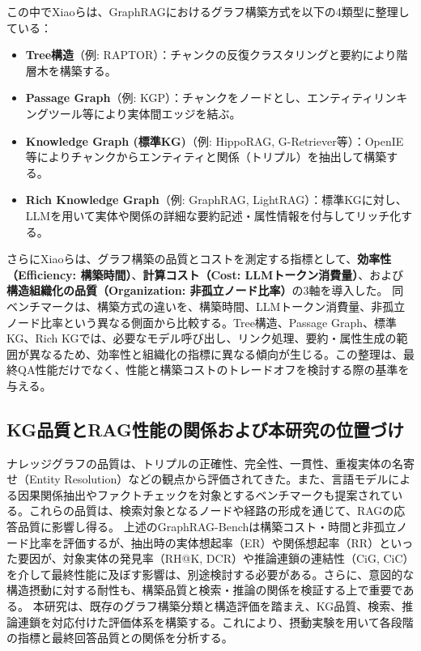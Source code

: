 \documentclass[a4j,dvipdfmx]{jsarticle}
\begin{document}
この中でXiaoらは、GraphRAGにおけるグラフ構築方式を以下の4類型に整理している：
\begin{itemize}
    \item \textbf{Tree構造}（例: RAPTOR）：チャンクの反復クラスタリングと要約により階層木を構築する。
    \item \textbf{Passage Graph}（例: KGP）：チャンクをノードとし、エンティティリンキングツール等により実体間エッジを結ぶ。
    \item \textbf{Knowledge Graph (標準KG)}（例: HippoRAG, G-Retriever等）：OpenIE等によりチャンクからエンティティと関係（トリプル）を抽出して構築する。
    \item \textbf{Rich Knowledge Graph}（例: GraphRAG, LightRAG）：標準KGに対し、LLMを用いて実体や関係の詳細な要約記述・属性情報を付与してリッチ化する。
\end{itemize}
さらにXiaoらは、グラフ構築の品質とコストを測定する指標として、\textbf{効率性（Efficiency: 構築時間）}、\textbf{計算コスト（Cost: LLMトークン消費量）}、および\textbf{構造組織化の品質（Organization: 非孤立ノード比率）}の3軸を導入した。
同ベンチマークは、構築方式の違いを、構築時間、LLMトークン消費量、非孤立ノード比率という異なる側面から比較する。Tree構造、Passage Graph、標準KG、Rich KGでは、必要なモデル呼び出し、リンク処理、要約・属性生成の範囲が異なるため、効率性と組織化の指標に異なる傾向が生じる。この整理は、最終QA性能だけでなく、性能と構築コストのトレードオフを検討する際の基準を与える。

\subsection{KG品質とRAG性能の関係および本研究の位置づけ}
ナレッジグラフの品質は、トリプルの正確性、完全性、一貫性、重複実体の名寄せ（Entity Resolution）などの観点から評価されてきた。また、言語モデルによる因果関係抽出やファクトチェックを対象とするベンチマークも提案されている\cite{ugai2025,trivedi2022musique}。これらの品質は、検索対象となるノードや経路の形成を通じて、RAGの応答品質に影響し得る。
上述のGraphRAG-Benchは構築コスト・時間と非孤立ノード比率を評価するが、抽出時の実体想起率（ER）や関係想起率（RR）といった要因が、対象実体の発見率（RH@K, DCR）や推論連鎖の連結性（CiG, CiC）を介して最終性能に及ぼす影響は、別途検討する必要がある。さらに、意図的な構造摂動に対する耐性も、構築品質と検索・推論の関係を検証する上で重要である。
本研究は、既存のグラフ構築分類と構造評価を踏まえ、KG品質、検索、推論連鎖を対応付けた評価体系を構築する。これにより、摂動実験を用いて各段階の指標と最終回答品質との関係を分析する。
\end{document}
